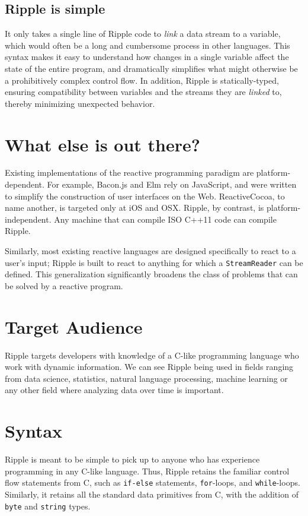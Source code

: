 \documentclass{article}
\newcommand{\code}{\texttt}
\begin{document}
\subsection*{Ripple is simple}
It only takes a single line of Ripple code to \emph{link} a data stream to a
variable, which would often be a long and cumbersome process in other languages. This syntax makes it easy to understand how changes in a single variable affect the state of the entire program, and dramatically simplifies what might otherwise be a prohibitively complex control flow. In addition, Ripple is statically-typed,
ensuring compatibility between variables and the streams they are \emph{linked}
to, thereby minimizing unexpected behavior.

\section*{What else is out there?}
Existing implementations of the reactive programming paradigm are platform-
dependent. For example, Bacon.js and Elm rely on JavaScript, and were written to
simplify the construction of user interfaces on the Web. ReactiveCocoa, to name
another, is targeted only at iOS and OSX. Ripple, by contrast, is platform-
independent. Any machine that can compile ISO C++11 code can compile Ripple.
    
Similarly, most existing reactive languages are designed specifically to react to a
user's input; Ripple is built to react to anything for which a
\code{StreamReader} can be defined. This generalization significantly broadens the class of problems that can be solved by a reactive program.

\section*{Target Audience}
Ripple targets developers with knowledge of a C-like programming language who work with dynamic information. We can see
Ripple being used in fields ranging from data science, statistics, natural
language processing, machine learning or any other field where analyzing data
over time is important.

\section*{Syntax}
Ripple is meant to be simple to pick up to anyone who has experience
programming in any C-like language. Thus, Ripple retains the familiar control
flow statements from C, such as \code{if-else} statements, \code{for}-loops, and
\code{while}-loops. Similarly, it retains all the standard data primitives from
C, with the addition of \code{byte} and \code{string} types.
    
\end{document}
